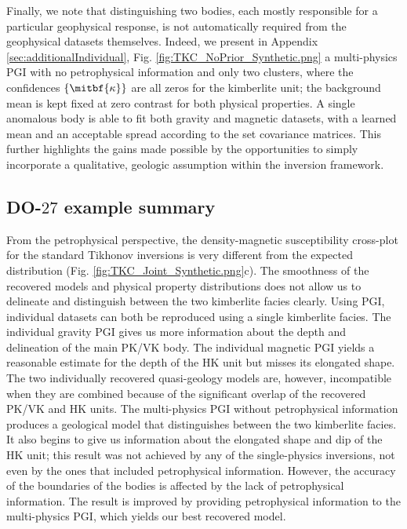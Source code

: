 \documentclass[extra, mreferee]{gji_joint} %
\begin{document}
Finally, we note that distinguishing two bodies, each mostly responsible for a particular geophysical response, is not automatically required from the geophysical datasets themselves. Indeed, we present in Appendix \ref{sec:additionalIndividual}, Fig. \ref{fig:TKC_NoPrior_Synthetic.png} a multi-physics PGI with no petrophysical information and only two clusters, where the confidences $\{\mitbf{\kappa}\}$ are all zeros for the kimberlite unit; the background mean is kept fixed at zero contrast for both physical properties. A single anomalous body is able to fit both gravity and magnetic datasets, with a learned mean and an acceptable spread according to the set covariance matrices. This further highlights the gains made possible by the opportunities to simply incorporate a qualitative, geologic assumption within the inversion framework.

\subsection{DO-$27$ example summary}

From the petrophysical perspective, the density-magnetic susceptibility cross-plot for the standard Tikhonov inversions is very different from the expected distribution (Fig. \ref{fig:TKC_Joint_Synthetic.png}c). The smoothness of the recovered models and physical property distributions does not allow us to delineate and distinguish between the two kimberlite facies clearly. Using PGI, individual datasets can both be reproduced using a single kimberlite facies. The individual gravity PGI gives us more information about the depth and delineation of the main PK/VK body. The individual magnetic PGI yields a reasonable estimate for the depth of the HK unit but misses its elongated shape. The two individually recovered quasi-geology models are, however, incompatible when they are combined because of the significant overlap of the recovered PK/VK and HK units. The multi-physics PGI without petrophysical information produces a geological model that distinguishes between the two kimberlite facies. It also begins to give us information about the elongated shape and dip of the HK unit; this result was not achieved by any of the single-physics inversions, not even by the ones that included petrophysical information. However, the accuracy of the boundaries of the bodies is affected by the lack of petrophysical information. The result is improved by providing petrophysical information to the multi-physics PGI, which yields our best recovered model.
\end{document}
